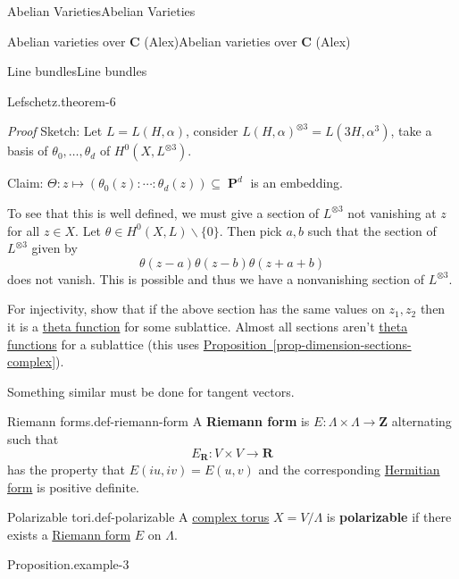 \documentclass[10pt,]{book}
\makeatletter
\newcommand{\terminology}[1]{\textbf{#1}}
\renewcommand*{\proofname}{Proof}
\renewenvironment{proof}[1][\proofname]{\par
  \pushQED{\qed}%
  \normalfont \topsep6\p@\@plus6\p@\relax
  \trivlist
  \item\relax
    {\itshape
    #1\@addpunct{.}}\hspace\labelsep\ignorespaces
}{%
  \popQED\endtrivlist\@endpefalse
}
\numberwithin{equation}{section}
\newcommand{\ZZ}{\mathbf{Z}}
\newcommand{\RR}{\mathbf{R}}
\newcommand{\CC}{\mathbf{C}}
\DeclareMathOperator{\PP}{\mathbf{P}}
\makeatother
\begin{document}
\begin{chapterptx}{Abelian Varieties}{}{Abelian Varieties}{}{}
\begin{sectionptx}{Abelian varieties over \(\CC\) (Alex)}{}{Abelian varieties over \(\CC\) (Alex)}{}{}
\begin{subsectionptx}{Line bundles}{}{Line bundles}{}{}
\begin{theorem}{Lefschetz.}{}{theorem-6}
\end{theorem}
\begin{proof}\hypertarget{proof-11}{}
\hypertarget{p-66}{}%
Sketch: Let \(L = L(H,\alpha)\), consider \(L(H,\alpha)^{\otimes 3} = L(3H, \alpha^3)\), take a basis of \(\theta_0,\ldots, \theta_d\) of \(H^0(X, L^{\otimes 3})\).%
\par
\hypertarget{p-67}{}%
Claim: \(\Theta\colon z\mapsto (\theta_0(z) :\cdots :\theta_d (z)) \subseteq \PP^d\) is an embedding.%
\par
\hypertarget{p-68}{}%
To see that this is well defined, we must give a section of \(L^{\otimes 3}\) not vanishing at \(z\) for all \(z\in X\). Let \(\theta \in H^0(X,L)\smallsetminus \{0\}\). Then pick \(a,b\) such that the section of \(L^{\otimes 3}\) given by%
\begin{equation*}
\theta(z-a)\theta(z-b) \theta(z+ a+b)
\end{equation*}
does not vanish. This is possible and thus we have a nonvanishing section of \(L^{\otimes 3}\).%
\par
\hypertarget{p-69}{}%
For injectivity, show that if the above section has the same values on \(z_1,z_2\) then it is a \hyperref[def-theta-function]{theta function} for some sublattice. Almost all sections aren't \hyperref[def-theta-function]{theta functions} for a sublattice (this uses \hyperref[prop-dimension-sections-complex]{Proposition~\ref{prop-dimension-sections-complex}}).%
\par
\hypertarget{p-70}{}%
Something similar must be done for tangent vectors.%
\end{proof}
\begin{definition}{Riemann forms.}{def-riemann-form}%
\hypertarget{p-71}{}%
A \terminology{Riemann form} is \(E\colon \Lambda \times \Lambda \to \ZZ\) alternating such that%
\begin{equation*}
E_\RR \colon V\times V\to \RR
\end{equation*}
has the property that \(E(iu,iv) = E(u,v)\) and  the corresponding \hyperref[sec-buntes-av-jac]{Hermitian form} is positive definite.%
\end{definition}
\begin{definition}{Polarizable tori.}{def-polarizable}%
\hypertarget{p-72}{}%
A \hyperref[def-complex-torus]{complex torus} \(X = V/\Lambda\) is \terminology{polarizable} if there exists a \hyperref[def-riemann-form]{Riemann form} \(E\) on \(\Lambda\).%
\end{definition}
\begin{example}{Proposition.}{example-3}%

\end{example}
\end{subsectionptx}
\end{sectionptx}
\end{chapterptx}
\end{document}
